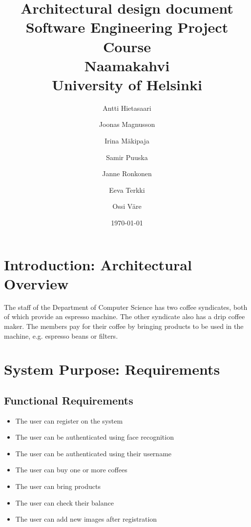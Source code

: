 \documentclass[11pt]{article}
\title{Architectural design document\\
  Software Engineering Project Course\\
  Naamakahvi\\
  University of Helsinki}
\author{Antti Hietasaari
  \and Joonas Magnusson
  \and Irina Mäkipaja
  \and Samir Puuska
  \and Janne Ronkonen
  \and Eeva Terkki
  \and Ossi Väre}
\date{\today}
\begin{document}
\maketitle

\tableofcontents



\section{Introduction: Architectural Overview}

The staff of the Department of Computer Science has two coffee
syndicates, both of which provide an espresso machine. The other
syndicate also has a drip coffee maker. The members pay for their
coffee by bringing products to be used in the machine, e.g. espresso
beans or filters.

\section{System Purpose: Requirements}


\subsection{Functional Requirements}

\begin{itemize}
\item{The user can register on the system}
\item{The user can be authenticated using face recognition}
\item{The user can be authenticated using their username}  
\item{The user can buy one or more coffees}
\item{The user can bring products}
\item{The user can check their balance}
\item{The user can add new images after registration}
\end{itemize}  
\end{document}
